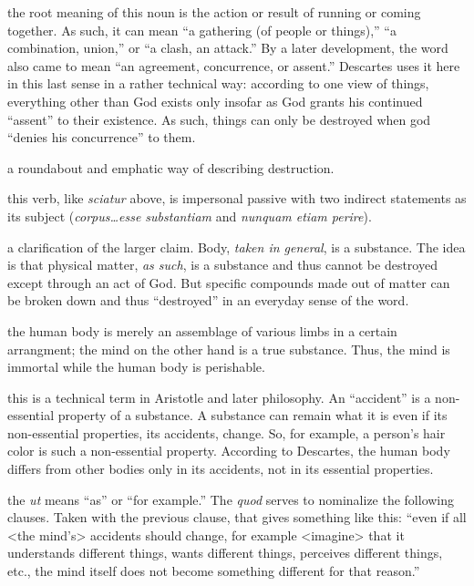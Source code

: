  the root meaning of this noun is the action or result of running or coming together. As such, it can mean ``a gathering (of people or things),'' ``a combination, union,'' or ``a clash, an attack.'' By a later development, the word also came to mean ``an agreement, concurrence, or assent.'' Descartes uses it here in this last sense in a rather technical way: according to one view of things, everything other than God exists only insofar as God grants his continued ``assent'' to their existence. As such, things can only be destroyed when god ``denies his concurrence'' to them.

 a roundabout and emphatic way of describing destruction.

 this verb, like \textit{sciatur} above, is impersonal passive with two indirect statements as its subject (\textit{corpus\dots esse substantiam} and \textit{nunquam etiam perire}).

 a clarification of the larger claim. Body, \textit{taken in general}, is a substance. The idea is that physical matter, \textit{as such}, is a substance and thus cannot be destroyed except through an act of God. But specific compounds made out of matter can be broken down and thus ``destroyed'' in an everyday sense of the word.

 the human body is merely an assemblage of various limbs in a certain arrangment; the mind on the other hand is a true substance. Thus, the mind is immortal while the human body is perishable.

 this is a technical term in Aristotle and later philosophy. An ``accident'' is a non-essential property of a substance. A substance can remain what it is even if its non-essential properties, its accidents, change. So, for example, a person's hair color is such a non-essential property. According to Descartes, the human body differs from other bodies only in its accidents, not in its essential properties.

 the \textit{ut} means ``as'' or ``for example.'' The \textit{quod} serves to nominalize the following clauses. Taken with the previous clause, that gives something like this: ``even if all <the mind's> accidents should change, for example <imagine> that it understands different things, wants different things, perceives different things, etc., the mind itself does not become something different for that reason.''

